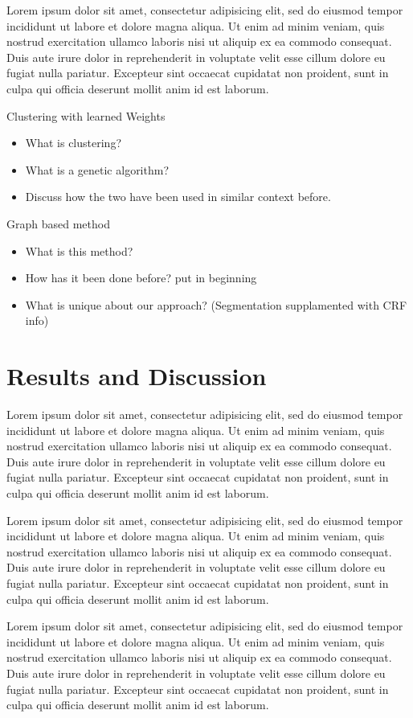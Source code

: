 \documentclass[10pt]{acmsiggraph}               %
\begin{document}
Lorem ipsum dolor sit amet, consectetur adipisicing elit, sed do eiusmod tempor incididunt ut labore et dolore magna aliqua. Ut enim ad minim veniam, quis nostrud exercitation ullamco laboris nisi ut aliquip ex ea commodo consequat. Duis aute irure dolor in reprehenderit in voluptate velit esse cillum dolore eu fugiat nulla pariatur. Excepteur sint occaecat cupidatat non proident, sunt in culpa qui officia deserunt mollit anim id est laborum.

Clustering with learned Weights
\begin{itemize}
\item What is clustering?
\item What is a genetic algorithm?
\item Discuss how the two have been used in similar context before.
\end{itemize}

Graph based method
\begin{itemize}
\item What is this method?
\item How has it been done before? put in beginning
\item What is unique about our approach? (Segmentation supplamented with CRF info)
\end{itemize}

\section{Results and Discussion}
Lorem ipsum dolor sit amet, consectetur adipisicing elit, sed do eiusmod tempor incididunt ut labore et dolore magna aliqua. Ut enim ad minim veniam, quis nostrud exercitation ullamco laboris nisi ut aliquip ex ea commodo consequat. Duis aute irure dolor in reprehenderit in voluptate velit esse cillum dolore eu fugiat nulla pariatur. Excepteur sint occaecat cupidatat non proident, sunt in culpa qui officia deserunt mollit anim id est laborum.

Lorem ipsum dolor sit amet, consectetur adipisicing elit, sed do eiusmod tempor incididunt ut labore et dolore magna aliqua. Ut enim ad minim veniam, quis nostrud exercitation ullamco laboris nisi ut aliquip ex ea commodo consequat. Duis aute irure dolor in reprehenderit in voluptate velit esse cillum dolore eu fugiat nulla pariatur. Excepteur sint occaecat cupidatat non proident, sunt in culpa qui officia deserunt mollit anim id est laborum.

Lorem ipsum dolor sit amet, consectetur adipisicing elit, sed do eiusmod tempor incididunt ut labore et dolore magna aliqua. Ut enim ad minim veniam, quis nostrud exercitation ullamco laboris nisi ut aliquip ex ea commodo consequat. Duis aute irure dolor in reprehenderit in voluptate velit esse cillum dolore eu fugiat nulla pariatur. Excepteur sint occaecat cupidatat non proident, sunt in culpa qui officia deserunt mollit anim id est laborum.
\end{document}

